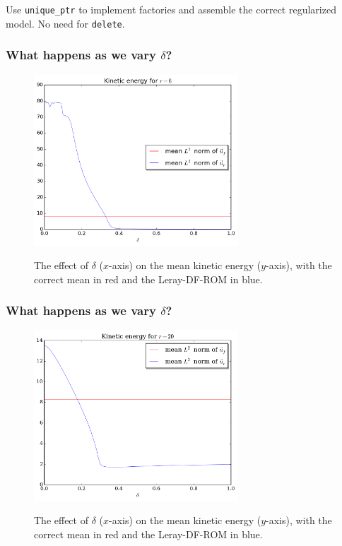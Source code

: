 \documentclass[mathserif]{beamer}
\begin{document}
\begin{frame}
    \begin{center}
        {
        \scriptsize
        
        }
    \end{center}
    \pause

    Use \texttt{unique\_ptr} to implement factories and assemble the correct
    regularized model. \pause No need for \texttt{delete}.
\end{frame}

\begin{frame}
    \frametitle{What happens as we vary \(\delta\)?}
    \begin{figure}
        \centering
        \includegraphics[width=3in]{../Pictures/NSE/leray-df/r-6/mean-ke.png}

        The effect of \(\delta\) (\(x\)-axis) on the mean kinetic energy
        (\(y\)-axis), with the correct mean in red and the Leray-DF-ROM in blue.
    \end{figure}
\end{frame}

\begin{frame}
    \frametitle{What happens as we vary \(\delta\)?}
    \begin{figure}
        \centering
        \includegraphics[width=3in]{../Pictures/NSE/leray-df/r-20/mean-ke.png}

        The effect of \(\delta\) (\(x\)-axis) on the mean kinetic energy
        (\(y\)-axis), with the correct mean in red and the Leray-DF-ROM in blue.
    \end{figure}
\end{frame}
\end{document}
